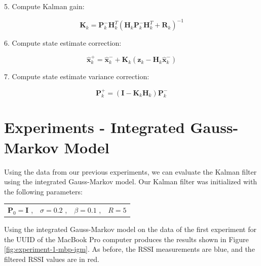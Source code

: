 \documentclass[12pt]{article}
\begin{document}
5. Compute Kalman gain:

\begin{equation}
    \mathbf{K}_k = \mathbf{P}_k^- \mathbf{H}_k^T
        \left (
            \mathbf{H}_k \mathbf{P}_k^- \mathbf{H}_k^T + \mathbf{R}_k
        \right )^{-1}
    \label{eq:IGM-KF-gain}
\end{equation}

6. Compute state estimate correction:

\begin{equation}
    \hat{\mathbf{x}}_k^+ = \hat{\mathbf{x}}_k^- + \mathbf{K}_k
    \left (
        \mathbf{z}_k - \mathbf{H}_k \hat{\mathbf{x}}_k^-
    \right )
    \label{eq:IGM-KF-x-correction}
\end{equation}

7. Compute state estimate variance correction:

\begin{equation}
    \mathbf{P}_k^+ = \left ( \mathbf{I} - \mathbf{K}_k \mathbf{H}_k \right ) \mathbf{P}_k^-
    \label{eq:IGM-KF-P-correction}
\end{equation}



%
%

\clearpage
\section{Experiments - Integrated Gauss-Markov Model}

Using the data from our previous experiments, we can evaluate the Kalman filter using the
integrated Gauss-Markov model. Our Kalman filter was initialized with the following
parameters:

\begin{center}
    \begin{tabular}{cccc}
        $\mathbf{P}_0 = \mathbf{I}$ ,
        &
        $\sigma = 0.2$ ,
        &
        $\beta = 0.1$ ,
        &
        $R = 5$
    \end{tabular}
\end{center}

Using the integrated Gauss-Markov model on the data of the first experiment for
the UUID of the MacBook Pro computer produces the results shown in Figure
\ref{fig:experiment-1-mbp-igm}. As before, the RSSI measurements are blue, and the
filtered RSSI values are in red.
\end{document}
